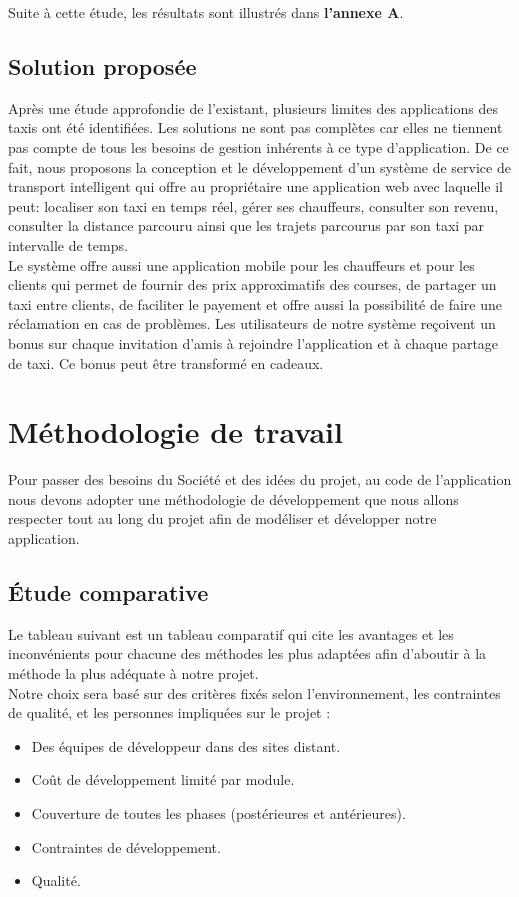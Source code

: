 {Suite à cette étude, les résultats sont illustrés dans \textbf{l'annexe A}.

\subsection{Solution proposée}

Après une étude approfondie de l'existant, plusieurs limites des applications des taxis  ont été identifiées. Les solutions ne sont pas complètes car elles ne tiennent pas compte de tous les besoins de gestion inhérents à ce type d'application. De ce fait, nous proposons la conception et le développement d'un système de service de transport intelligent qui offre au propriétaire une application web avec laquelle il peut: localiser son taxi en temps réel, gérer ses chauffeurs, consulter son revenu, consulter la distance parcouru ainsi que  les trajets parcourus par son taxi par intervalle de temps. \\

Le système offre aussi une application mobile pour les chauffeurs et pour les clients qui permet de fournir des prix approximatifs des courses, de partager un taxi entre clients, de faciliter le payement et offre  aussi la possibilité de faire une réclamation en cas de problèmes. Les utilisateurs de notre système reçoivent un bonus sur chaque invitation d'amis à rejoindre l'application et à chaque partage de taxi. Ce bonus peut être transformé en cadeaux.

\section{Méthodologie de travail}

Pour passer des besoins du Société et des idées du projet, au code de l'application nous devons adopter une méthodologie de développement que nous allons respecter tout au long du projet afin de modéliser et développer notre application.

\subsection{Étude comparative}

Le tableau suivant est un tableau comparatif qui cite les avantages et les inconvénients pour chacune des méthodes les plus adaptées afin d'aboutir à la méthode la plus adéquate à notre projet. \\

Notre choix sera basé sur des critères fixés selon l'environnement, les contraintes de qualité, et les personnes impliquées sur le projet :
\begin{itemize}
\item Des équipes de développeur dans des sites distant.
\item Coût de développement limité par module.
\item Couverture de toutes les phases (postérieures et antérieures).
\item Contraintes de développement.
\item Qualité.
\end{itemize}

}
